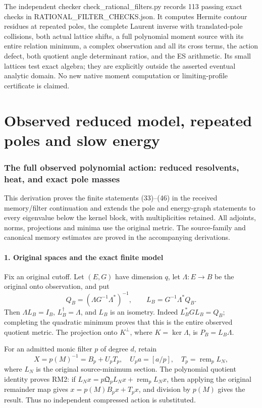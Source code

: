 \documentclass[11pt]{article}
\begin{document}
The independent checker check\_rational\_filters.py records 113 passing exact checks in RATIONAL\_FILTER\_CHECKS.json. It computes Hermite contour residues at repeated poles, the complete Laurent inverse with translated-pole collisions, both actual lattice shifts, a full polynomial moment source with its entire relation minimum, a complex observation and all its cross terms, the action defect, both quotient angle determinant ratios, and the ES arithmetic. Its small lattices test exact algebra; they are explicitly outside the asserted eventual analytic domain. No new native moment computation or limiting-profile certificate is claimed.


\clearpage\part{Observed reduced model, repeated poles and slow energy}
\section{The full observed polynomial action: reduced resolvents, heat, and exact pole masses}\label{the-full-observed-polynomial-action-reduced-resolvents-heat-and-exact-pole-masses}

This derivation proves the finite statements (33)--(46) in the received memory/filter continuation and extends the pole and energy-graph statements to every eigenvalue below the kernel block, with multiplicities retained. All adjoints, norms, projections and minima use the original metric. The source-family and canonical memory estimates are proved in the accompanying derivations.

\subsection{1. Original spaces and the exact finite model}\label{original-spaces-and-the-exact-finite-model}

Fix an original cutoff. Let \((E,G)\) have dimension \(q\), let \(\Lambda:E\to B\) be the original onto observation, and put \[
Q_B=(\Lambda G^{-1}\Lambda^*)^{-1},\qquad
L_B=G^{-1}\Lambda^*Q_B.
\tag{RM1}
\] Then \(\Lambda L_B=I_B\), \(L_B^\dagger=\Lambda\), and \(L_B\) is an isometry. Indeed \(L_B^*GL_B=Q_B\); completing the quadratic minimum proves that this is the entire observed quotient metric. The projection onto \(K^\perp\), where \(K=\ker\Lambda\), is \(P_B=L_B\Lambda\).

For an admitted monic filter \(p\) of degree \(d\), retain \[
X=p(M)^{-1}=B_p+U_pT_p,\quad
U_pa=[a/p],\quad T_p=\operatorname{rem}_pL_N,
\tag{RM2}
\] where \(L_N\) is the original source-minimum section. The polynomial quotient identity proves RM2: if \(L_Nx=p\mathfrak Q_pL_Nx+\operatorname{rem}_pL_Nx\), then applying the original remainder map gives \(x=p(M)B_px+T_px\), and division by \(p(M)\) gives the result. Thus no independent compressed action is substituted.
\end{document}
